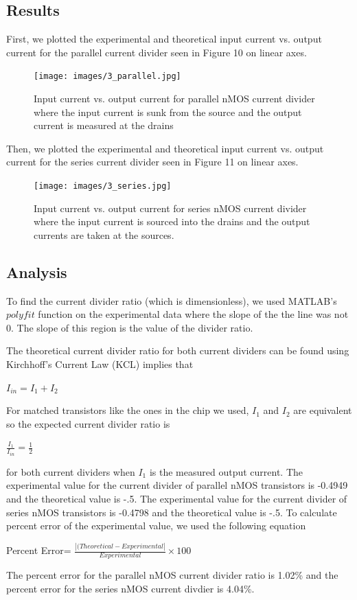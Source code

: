 \documentclass{article}
\begin{document}
\subsection{Results}
First, we plotted the experimental and theoretical input current vs. output current for the parallel current divider seen in Figure 10 on linear axes.
\begin{figure}[H]   
  \begin{center}      
  \texttt{[image: images/3\_parallel.jpg]}
  \caption{Input current vs. output current for parallel nMOS current divider where the
input current is sunk from the source and the output current is measured at the drains}
  \label{fig:exp3_parallel}
  \end{center}
\end{figure}
Then, we plotted the experimental and theoretical input current vs. output current for the series current divider seen in Figure 11 on linear axes.  
\begin{figure}[H]   
  \begin{center}      
  \texttt{[image: images/3\_series.jpg]}
  \caption{Input current vs. output current for series nMOS current divider where the input current is sourced into the drains and the output currents are taken at
the sources.}
  \label{fig:exp3_series}
  \end{center}
\end{figure}

\subsection{Analysis}
To find the current divider ratio (which is dimensionless), we used MATLAB's $polyfit$ function on the experimental data where the slope of the the line was not 0.  The slope of this region is the value of the divider ratio. 

The theoretical current divider ratio for both current dividers can be found using Kirchhoff’s Current Law (KCL) implies that 
\begin{center}
$I_{in} =
I_{1} + I_{2}$
\end{center}
For matched transistors like the ones in the chip we used, $I_{1}$ and $I_{2}$ are equivalent so the expected current divider ratio is
\begin{center}
$\frac{I_{1}}{I_{in}} = \frac{1}{2}$
\end{center}
 for both current dividers when $I_{1}$ is the measured output current.  The experimental value for the current divider of parallel nMOS transistors is -0.4949 and the theoretical value is -.5.  The experimental value for the current divider of series nMOS transistors is -0.4798 and the theoretical value is -.5. To calculate percent error of the experimental value, we used the following equation 
\begin{center}
 
Percent Error= $\frac{|(Theoretical-Experimental|}{Experimental}\times 100$


\end{center}
The percent error for the parallel nMOS current divider ratio is 1.02\% and the percent error for the series nMOS current divdier is 4.04\%.
\end{document}
